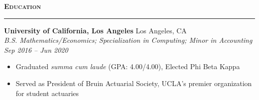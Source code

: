 \documentclass[11pt,letterpaper]{article}
\newcommand{\sectline}{\vspace{5pt}\hrule height 1.5pt\vspace{5pt}}
\newcommand{\sectspace}{\vspace{9pt}}
\newcommand{\smallspace}{\vspace{6pt}}
\newcommand{\heading}[1]{{\fontsize{14pt}{13pt} {\textbf{\textsc{#1}}}}}
\begin{document}
\sectspace

\heading{Education}\sectline
\textbf{University of California, Los Angeles} \hfill Los Angeles, CA \\
\textit{B.S. Mathematics/Economics; Specialization in Computing; Minor in Accounting} \hfill \textit{Sep 2016 -- Jun 2020}
\begin{itemize}
	\item Graduated \textit{summa cum laude} (GPA: 4.00/4.00), Elected Phi Beta Kappa%
	\item Served as President of Bruin Actuarial Society, UCLA's premier organization for student actuaries 
\end{itemize}
\sectspace

\end{document}
